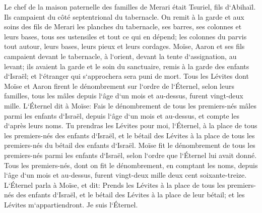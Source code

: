 \verse Le chef de la maison paternelle des familles de Merari était Tsuriel, fils d`Abihaïl. Ils campaient du côté septentrional du tabernacle. 
\verse On remit à la garde et aux soins des fils de Merari les planches du tabernacle, ses barres, ses colonnes et leurs bases, tous ses ustensiles et tout ce qui en dépend; 
\verse les colonnes du parvis tout autour, leurs bases, leurs pieux et leurs cordages. 
\verse Moïse, Aaron et ses fils campaient devant le tabernacle, à l`orient, devant la tente d`assignation, au levant; ils avaient la garde et le soin du sanctuaire, remis à la garde des enfants d`Israël; et l`étranger qui s`approchera sera puni de mort. 
\verse Tous les Lévites dont Moïse et Aaron firent le dénombrement sur l`ordre de l`Éternel, selon leurs familles, tous les mâles depuis l`âge d`un mois et au-dessus, furent vingt-deux mille. 
\verse L`Éternel dit à Moïse: Fais le dénombrement de tous les premiers-nés mâles parmi les enfants d`Israël, depuis l`âge d`un mois et au-dessus, et compte les d`après leurs noms. 
\verse Tu prendras les Lévites pour moi, l`Éternel, à la place de tous les premiers-nés des enfants d`Israël, et le bétail des Lévites à la place de tous les premiers-nés du bétail des enfants d`Israël. 
\verse Moïse fit le dénombrement de tous les premiers-nés parmi les enfants d`Israël, selon l`ordre que l`Éternel lui avait donné. 
\verse Tous les premiers-nés, dont on fit le dénombrement, en comptant les noms, depuis l`âge d`un mois et au-dessus, furent vingt-deux mille deux cent soixante-treize. 
\verse L`Éternel parla à Moïse, et dit: 
\verse Prends les Lévites à la place de tous les premiers-nés des enfants d`Israël, et le bétail des Lévites à la place de leur bétail; et les Lévites m`appartiendront. Je suis l`Éternel. 
